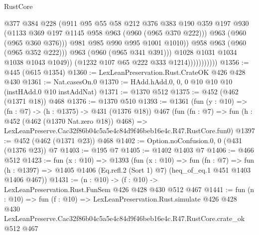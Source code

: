 \begin{lexlean}{RustCore}
\begin{coremodule}
                                    @377
                                    @384
                                    @228
                                    (@911
                                      @95
                                      @55
                                      @58
                                      @212
                                      @376
                                      @383
                                      @190
                                      @359
                                      @197
                                      @930
                                      (@1133 @369 @197 @1145 @958 @963 (@960 (@965 @370 @222)))
                                      @963
                                      (@960 (@965 @360 @376)))
                                    @981
                                    @985
                                    @990
                                    @995
                                    @1001
                                    @1010))
                                @958
                                @963
                                (@960 (@965 @352 @222)))
                              @963
                              (@960 (@965 @341 @391)))
                            @1028
                            @1031
                            @1034
                            @1038
                            @1043
                            @1049))
                        (@1232 @107 @65 @222 @333 @1214)))))))))))
@1356 := @445 (@615 @1354)
@1360 := LexLeanPreservation.Rust.CrateOK @426 @428 @430
@1361 := Nat.casesOn.{0}
@1370 := HAdd.hAdd.{0, 0, 0} @10 @10 @10 (instHAdd.{0} @10 instAddNat)
@1371 := @1370 @512
@1375 := @452 (@462 (@1371 @18)) @468
@1376 := @1370 @510
@1393 := @1361
    (fun (y : @10) => (fn : @7) -> (h : @1375) -> @431 (@1376 @18))
    @467
    (fun (fn : @7) =>
    fun (h : @452 (@462 (@1370 Nat.zero @18)) @468) =>
    LexLeanPreserve.Cac32f86b04c5a5e4c84d9f46beb16e4c.R47.RustCore.fun0)
@1397 := @452 (@462 (@1371 @23)) @468
@1402 := Option.noConfusion.{0, 0} (@431 (@1376 @23)) @7
@1403 := @195 @7
@1405 := @1402 @1403 @7
@1406 := @466 @512
@1423 := fun (x : @10) =>
  @1393
    (fun (x : @10) =>
    fun (fn : @7) =>
    fun (h : @1397) => @1405 @1406 (Eq.refl.{2} (Sort 1) @7) (heq_of_eq.{1} @451 @1403 @1406 @467))
@1431 := (n : @10) -> (f : @10) -> LexLeanPreservation.Rust.FunSem @426 @428 @430 @512 @467
@1441 := fun (n : @10) =>
  fun (f : @10) =>
  LexLeanPreservation.Rust.simulate
    @426
    @428
    @430
    LexLeanPreserve.Cac32f86b04c5a5e4c84d9f46beb16e4c.R47.RustCore.crate_ok
    @512
    @467
\end{coremodule}
\end{lexlean}
